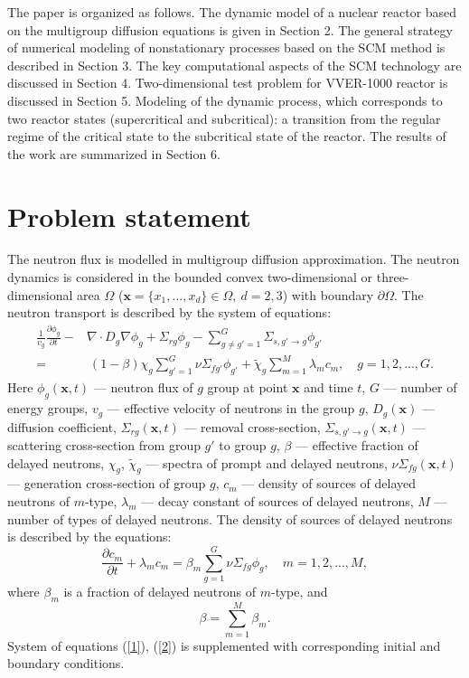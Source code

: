 \documentclass[authoryear]{elsarticle}
\begin{document}
The paper is organized as follows. The dynamic model of a nuclear reactor based on the multigroup diffusion equations is given in Section 2. The general strategy of numerical modeling of nonstationary processes based on the SCM method is described in Section 3. The key computational aspects of the SCM technology are discussed in Section 4. Two-dimensional test problem for VVER-1000 reactor is discussed in Section 5. Modeling of the dynamic process, which corresponds to two reactor states (supercritical and subcritical): a transition from the regular regime of the critical state to the subcritical state of the reactor. The results of the work are summarized in Section 6.

\section{Problem statement}

The neutron flux is modelled in multigroup diffusion approximation. The neutron dynamics is considered in the bounded convex two-dimensional or three-dimensional area  $\Omega$ ($\bm x = \{x_1, ..., x_d\} \in \Omega, \ d = 2,3$) with boundary $\partial \Omega$. The neutron transport is described by the system of equations:
\begin{equation}\label{1}
\begin{split}
 \frac{1}{v_g} \frac{\partial \phi_g}{\partial t} - & \nabla \cdot D_g \nabla \phi_g + \Sigma_{rg} \phi_g 
 - \sum_{g\neq g'=1}^{G} \Sigma_{s,g'\rightarrow g} \phi_{g'} \\
 =  & \ (1-\beta) \chi_g \sum_{g'=1}^{G} \nu \Sigma_{fg'} \phi_{g'} + \widetilde{\chi}_g \sum_{m=1}^{M} \lambda_m c_m , \quad 
 g = 1,2, ..., G .
\end{split}
\end{equation} 
Here $\phi_g(\bm x,t)$ --- neutron flux of $g$ group at point $\bm x$ and time $t$,
$G$ --- number of energy groups,
$v_g$ --- effective velocity of neutrons in the group $g$,
$D_g(\bm x)$ --- diffusion coefficient, $\Sigma_{rg}(\bm x,t)$ --- removal cross-section,
$\Sigma_{s,g'\rightarrow g}(\bm x,t)$ --- scattering cross-section from group $g'$ to group $g$,
$\beta$ --- effective fraction of delayed neutrons, $\chi_g$, $\widetilde{\chi}_g$  --- spectra of prompt and delayed neutrons, 
$\nu\Sigma_{fg}(\bm x,t)$ --- generation cross-section of group $g$,
$c_m$ --- density of sources of delayed neutrons of $m$-type,  $\lambda_m$ --- decay constant of sources of delayed neutrons,
$M$ --- number of types of delayed neutrons.
The density of sources of delayed neutrons is described by the equations:
\begin{equation}\label{2}
 \frac{\partial c_m}{\partial t} + \lambda_m c_m = \beta_m \sum_{g=1}^{G} \nu \Sigma_{fg} \phi_g ,
 \quad m = 1,2, ..., M , 
\end{equation} 
where $\beta_m$ is a fraction of delayed neutrons of $m$-type, and
\[
 \beta = \sum_{m=1}^{M} \beta_m .
\] 
System of equations (\ref{1}), (\ref{2}) is supplemented with corresponding initial and boundary conditions.
\end{document}
